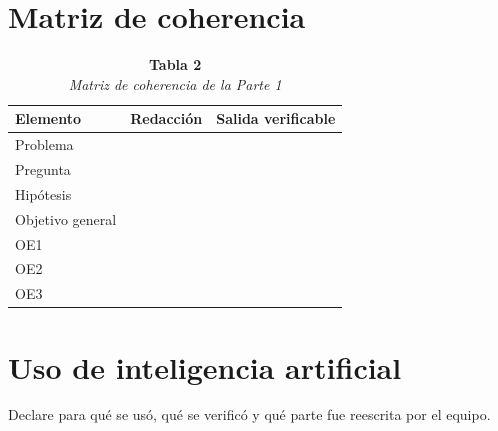 \documentclass[12pt,a4paper]{article}
\begin{document}
\section{Matriz de coherencia}
\begin{table}[ht]
\centering
\singlespacing
\caption*{\textbf{Tabla 2}\\\textit{Matriz de coherencia de la Parte 1}}
\begin{tabular}{p{3cm}p{7cm}p{4cm}}
\toprule
Elemento & Redacci\'on & Salida verificable \\
\midrule
Problema & & \\
Pregunta & & \\
Hip\'otesis & & \\
Objetivo general & & \\
OE1 & & \\
OE2 & & \\
OE3 & & \\
\bottomrule
\end{tabular}
\end{table}
\doublespacing

\printbibliography[title={Referencias}]

\appendix
\section{Uso de inteligencia artificial}
Declare para qu\'e se us\'o, qu\'e se verific\'o y qu\'e parte fue reescrita por el equipo.
\end{document}
